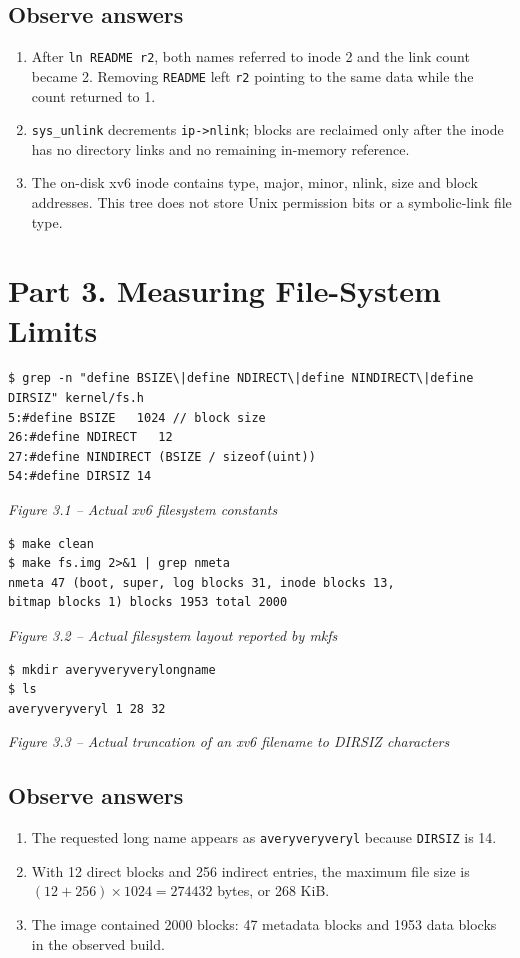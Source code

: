\documentclass[12pt,a4paper]{article}
\newcommand{\figcap}[1]{\begin{center}\small\textit{#1}\end{center}\vspace{0.4em}}
\begin{document}
\subsection{Observe answers}
\begin{enumerate}[label=\arabic*.]
\item After \texttt{ln README r2}, both names referred to inode 2 and the link count became 2. Removing \texttt{README} left \texttt{r2} pointing to the same data while the count returned to 1.
\item \texttt{sys\_unlink} decrements \texttt{ip->nlink}; blocks are reclaimed only after the inode has no directory links and no remaining in-memory reference.
\item The on-disk xv6 inode contains type, major, minor, nlink, size and block addresses. This tree does not store Unix permission bits or a symbolic-link file type.
\end{enumerate}

\section{Part 3. Measuring File-System Limits}
\begin{lstlisting}
$ grep -n "define BSIZE\|define NDIRECT\|define NINDIRECT\|define DIRSIZ" kernel/fs.h
5:#define BSIZE   1024 // block size
26:#define NDIRECT   12
27:#define NINDIRECT (BSIZE / sizeof(uint))
54:#define DIRSIZ 14
\end{lstlisting}
\figcap{Figure 3.1 -- Actual xv6 filesystem constants}

\begin{lstlisting}
$ make clean
$ make fs.img 2>&1 | grep nmeta
nmeta 47 (boot, super, log blocks 31, inode blocks 13,
bitmap blocks 1) blocks 1953 total 2000
\end{lstlisting}
\figcap{Figure 3.2 -- Actual filesystem layout reported by mkfs}

\begin{lstlisting}
$ mkdir averyveryverylongname
$ ls
averyveryveryl 1 28 32
\end{lstlisting}
\figcap{Figure 3.3 -- Actual truncation of an xv6 filename to DIRSIZ characters}

\subsection{Observe answers}
\begin{enumerate}[label=\arabic*.]
\item The requested long name appears as \texttt{averyveryveryl} because \texttt{DIRSIZ} is 14.
\item With 12 direct blocks and 256 indirect entries, the maximum file size is \((12+256)\times1024=274432\) bytes, or 268 KiB.
\item The image contained 2000 blocks: 47 metadata blocks and 1953 data blocks in the observed build.
\end{enumerate}
\end{document}
